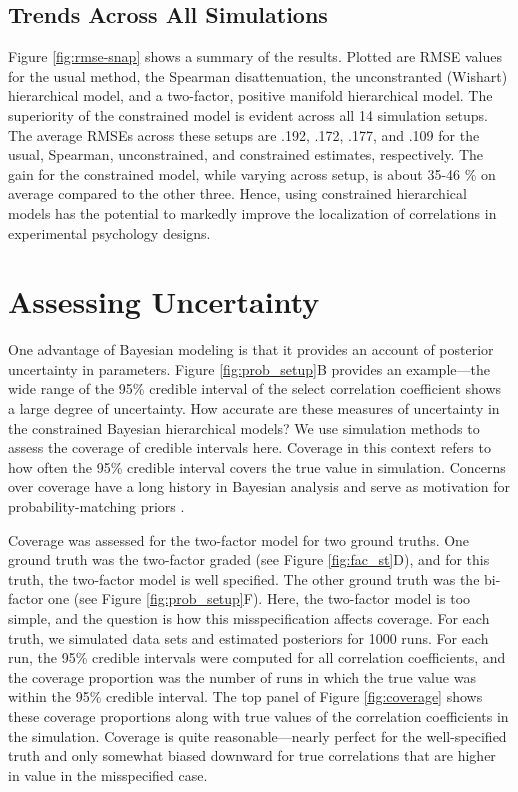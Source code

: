 \documentclass[man, 12pt]{apa7} %
\begin{document}
\subsection{Trends Across All Simulations}

Figure \ref{fig:rmse-snap} shows a summary of the results.  Plotted are RMSE values for the usual method, the Spearman disattenuation, the unconstranted (Wishart) hierarchical model, and a two-factor, positive manifold hierarchical model.  The superiority of the constrained model is evident across all 14 simulation setups.  The average RMSEs across these setups are .192, .172, .177, and .109 for the usual, Spearman, unconstrained, and constrained estimates, respectively.  The gain for the constrained model, while varying across setup, is about 35-46 \% on average compared to the other three.  Hence, using constrained hierarchical models has the potential to markedly improve the localization of correlations in experimental psychology designs. 

\section{Assessing Uncertainty}

One advantage of  Bayesian modeling is that it provides an account of posterior uncertainty in parameters.  Figure \ref{fig:prob_setup}B provides an example---the wide range of the 95\% credible interval of the select correlation coefficient shows a large degree of uncertainty.  How accurate are these measures of uncertainty in the constrained Bayesian hierarchical models?  We use simulation methods to assess the coverage of credible intervals here.  Coverage in this context refers to how often the 95\% credible interval covers the true value in simulation.  Concerns over coverage have a long history in Bayesian analysis and serve as motivation for probability-matching priors \parencite[]{Stein.1985,Datta.Mukerjee.2004a}. 

Coverage was assessed for the two-factor model for two ground truths.  One ground truth was the two-factor graded (see Figure \ref{fig:fac_st}D), and for this truth, the two-factor model is well specified.  The other ground truth was the bi-factor one (see Figure \ref{fig:prob_setup}F).  Here, the two-factor model is too simple, and the question is how this misspecification affects coverage.  For each truth, we simulated data sets and estimated posteriors for 1000 runs.  For each run, the 95\% credible intervals were computed for all correlation coefficients, and the coverage proportion was the number of runs in which the true value was within the 95\% credible interval.  The top panel of Figure \ref{fig:coverage} shows these coverage proportions along with true values of the correlation coefficients in the simulation.  Coverage is quite reasonable---nearly perfect for the well-specified truth and only somewhat biased downward for true correlations that are higher in value in the misspecified case.
\end{document}
